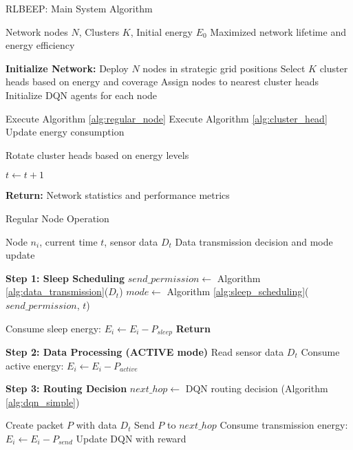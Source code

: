 \documentclass{article}
\begin{document}
\begin{algorithm}[H]
\caption{RLBEEP: Main System Algorithm}
\label{alg:rlbeep_main}
\begin{algorithmic}[1]

\REQUIRE Network nodes $N$, Clusters $K$, Initial energy $E_0$
\ENSURE Maximized network lifetime and energy efficiency

\STATE \textbf{Initialize Network:}
\STATE Deploy $N$ nodes in strategic grid positions
\STATE Select $K$ cluster heads based on energy and coverage
\STATE Assign nodes to nearest cluster heads
\STATE Initialize DQN agents for each node

            \STATE Execute Algorithm \ref{alg:regular_node}
            \STATE Execute Algorithm \ref{alg:cluster_head}
        \ENDIF
        \STATE Update energy consumption
    \ENDFOR
    
        \STATE Rotate cluster heads based on energy levels
    \ENDIF
    
    \STATE $t \leftarrow t + 1$
\ENDWHILE

\STATE \textbf{Return:} Network statistics and performance metrics

\end{algorithmic}
\end{algorithm}

\begin{algorithm}[H]
\caption{Regular Node Operation}
\label{alg:regular_node}
\begin{algorithmic}[1]

\REQUIRE Node $n_i$, current time $t$, sensor data $D_t$
\ENSURE Data transmission decision and mode update

\STATE \textbf{Step 1: Sleep Scheduling}
\STATE $send\_permission \leftarrow$ Algorithm \ref{alg:data_transmission}($D_t$)
\STATE $mode \leftarrow$ Algorithm \ref{alg:sleep_scheduling}($send\_permission$, $t$)

    \STATE Consume sleep energy: $E_i \leftarrow E_i - P_{sleep}$
    \STATE \textbf{Return} 
\ENDIF

\STATE \textbf{Step 2: Data Processing (ACTIVE mode)}
\STATE Read sensor data $D_t$
\STATE Consume active energy: $E_i \leftarrow E_i - P_{active}$

    \STATE \textbf{Step 3: Routing Decision}
    \STATE $next\_hop \leftarrow$ DQN routing decision (Algorithm \ref{alg:dqn_simple})
    
        \STATE Create packet $P$ with data $D_t$
        \STATE Send $P$ to $next\_hop$
        \STATE Consume transmission energy: $E_i \leftarrow E_i - P_{send}$
        \STATE Update DQN with reward
    \ENDIF
\ENDIF

\end{algorithmic}
\end{algorithm}
\end{document}
